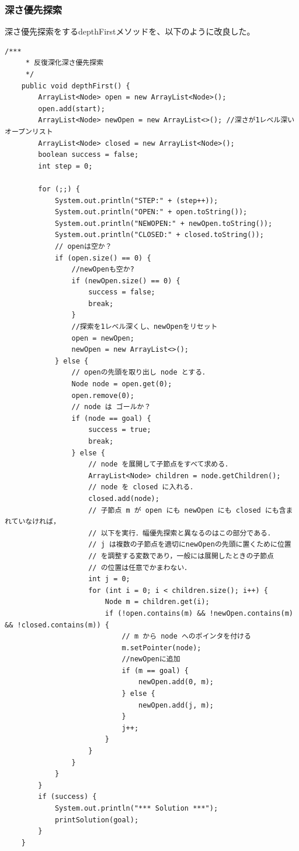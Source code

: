 \documentclass{jarticle}
\begin{document}
\subsubsection{深さ優先探索}
深さ優先探索をするdepthFirstメソッドを、以下のように改良した。
\begin{lstlisting}[caption=depthFirstメソッド,label=src:depthFirst]
    /***
     * 反復深化深さ優先探索
     */
    public void depthFirst() {
        ArrayList<Node> open = new ArrayList<Node>();
        open.add(start);
        ArrayList<Node> newOpen = new ArrayList<>(); //深さが1レベル深いオープンリスト
        ArrayList<Node> closed = new ArrayList<Node>();
        boolean success = false;
        int step = 0;

        for (;;) {
            System.out.println("STEP:" + (step++));
            System.out.println("OPEN:" + open.toString());
            System.out.println("NEWOPEN:" + newOpen.toString());
            System.out.println("CLOSED:" + closed.toString());
            // openは空か？
            if (open.size() == 0) {
                //newOpenも空か?
                if (newOpen.size() == 0) {
                    success = false;
                    break;
                }
                //探索を1レベル深くし、newOpenをリセット
                open = newOpen;
                newOpen = new ArrayList<>();
            } else {
                // openの先頭を取り出し node とする．
                Node node = open.get(0);
                open.remove(0);
                // node は ゴールか？
                if (node == goal) {
                    success = true;
                    break;
                } else {
                    // node を展開して子節点をすべて求める．
                    ArrayList<Node> children = node.getChildren();
                    // node を closed に入れる．
                    closed.add(node);
                    // 子節点 m が open にも newOpen にも closed にも含まれていなければ，
                    // 以下を実行．幅優先探索と異なるのはこの部分である．
                    // j は複数の子節点を適切にnewOpenの先頭に置くために位置
                    // を調整する変数であり，一般には展開したときの子節点
                    // の位置は任意でかまわない．
                    int j = 0;
                    for (int i = 0; i < children.size(); i++) {
                        Node m = children.get(i);
                        if (!open.contains(m) && !newOpen.contains(m) && !closed.contains(m)) {
                            // m から node へのポインタを付ける
                            m.setPointer(node);
                            //newOpenに追加
                            if (m == goal) {
                                newOpen.add(0, m);
                            } else {
                                newOpen.add(j, m);
                            }
                            j++;
                        }
                    }
                }
            }
        }
        if (success) {
            System.out.println("*** Solution ***");
            printSolution(goal);
        }
    }

\end{lstlisting}
\end{document}
